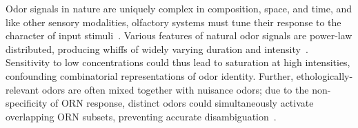 \documentclass[9pt,twocolumn,twoside,lineno]{pnas-new}
\begin{document}

Odor signals in nature are uniquely complex in composition, space, and time, and like other sensory modalities, olfactory systems must tune their response to the character of input stimuli~\cite{murlis_odor_plumes, fluid_dynamics_chemosensory, celani, carde_navigation, srinivas_elife}. Various features of natural odor signals are power-law distributed, producing whiffs of widely varying duration and intensity~\cite{celani}. Sensitivity to low concentrations could thus lead to saturation at high intensities, confounding combinatorial representations of odor identity. Further, ethologically-relevant odors are often mixed together with nuisance odors; due to the non-specificity of ORN response, distinct odors could simultaneously activate overlapping ORN subsets, preventing  accurate disambiguation~\cite{odor_backgrounds}. 
\end{document}

